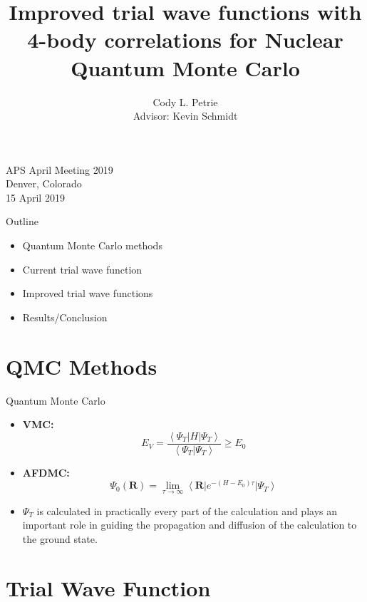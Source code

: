 \documentclass{beamer}
\title[Improved trial wave function for QMC]{Improved trial wave functions with 4-body correlations for Nuclear Quantum Monte Carlo}
\author[Cody L. Petrie, cody.petrie@asu.edu]{Cody L. Petrie\\
Advisor: Kevin Schmidt}
\institute{Arizona State University \\ Tempe, AZ}
\date{}
\newcommand{\ket}[1]{\left| #1 \right>}
\newcommand{\bra}[1]{\left< #1 \right|}
\newcommand{\braket}[2]{\left< #1 | #2 \right>}
\newcommand{\R}{\mathbf{R}}
\begin{document}
\begin{frame}
   \titlepage
   \centering
   \vspace{-1.0cm}
   \small
APS April Meeting 2019 \\
Denver, Colorado \\
15 April 2019
\end{frame}

\begin{frame}{Outline}
\begin{itemize}
   \item Quantum Monte Carlo methods
   \item Current trial wave function
   \item Improved trial wave functions
   \item Results/Conclusion
\end{itemize}
\end{frame}

\section{QMC Methods}
\begin{frame}{Quantum Monte Carlo}
\begin{itemize}
   \item \textbf{VMC:}
   \begin{equation*}
      E_V = \frac{\bra{\Psi_T}H\ket{\Psi_T}}{\braket{\Psi_T}{\Psi_T}} \ge E_0
   \end{equation*}
   \item \textbf{AFDMC:}
   \begin{equation*}
      \Psi_0(\R) = \lim\limits_{\tau\rightarrow\infty}\bra{\R}e^{-(H-E_0)\tau}\ket{\Psi_T}
   \end{equation*}
   \item $\Psi_T$ is calculated in practically every part of the calculation and plays an important role in guiding the propagation and diffusion of the calculation to the ground state.
\end{itemize}
\end{frame}

\section{Trial Wave Function}
\end{document}

